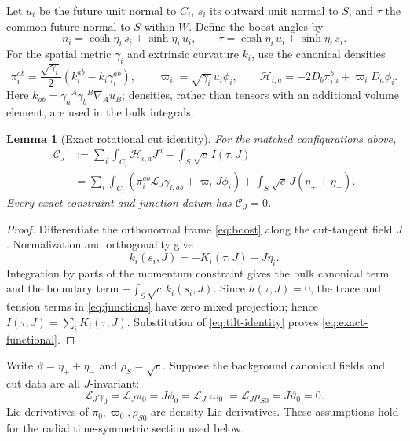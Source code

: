 \documentclass[11pt]{article}
\newtheorem{lemma}[theorem]{Lemma}
\theoremstyle{remark}
\newcommand{\Lie}{\mathcal L}
\begin{document}
Let $u_i$ be the future unit normal to $C_i$, $s_i$ its outward unit normal
to $S$, and $\tau$ the common future normal to $S$ within $W$. Define the
boost angles by
\begin{equation}
 n_i=\cosh\eta_i\,s_i+\sinh\eta_i\,u_i,
 \qquad
 \tau=\cosh\eta_i\,u_i+\sinh\eta_i\,s_i.
 \label{eq:boost}
\end{equation}
For the spatial metric $\gamma_i$ and extrinsic curvature $k_i$, use the
canonical densities
\begin{equation}
 \pi_i^{ab}=\frac{\sqrt{\gamma_i}}{2}
 (k_i^{ab}-k_i\gamma_i^{ab}),\qquad
 \varpi_i=\sqrt{\gamma_i}\,u_i\phi_i,
 \qquad
 \mathcal H_{i,a}=-2D_b\pi_i^b{}_a+\varpi_iD_a\phi_i.
 \label{eq:canonical}
\end{equation}
Here $k_{ab}=\gamma_a{}^A\gamma_b{}^B\nabla_Au_B$; densities, rather than
tensors with an additional volume element, are used in the bulk integrals.

\begin{lemma}[Exact rotational cut identity]
\label{lem:cut}
For the matched configurations above,
\begin{align}
 \mathcal C_J
 &:={\sum_i}\int_{C_i}\mathcal H_{i,a}J^a
       -\int_S\sqrt c\,I(\tau,J)\nonumber\\
 &=\sum_i\int_{C_i}
       (\pi_i^{ab}\Lie_J\gamma_{i,ab}+\varpi_iJ\phi_i)
       +\int_S\sqrt c\,J(\eta_++\eta_-).
 \label{eq:exact-functional}
\end{align}
Every exact constraint-and-junction datum has $\mathcal C_J=0$.
\end{lemma}
\begin{proof}
Differentiate the orthonormal frame \eqref{eq:boost} along the cut-tangent
field $J$. Normalization and orthogonality give
\begin{equation}
 k_i(s_i,J)=-K_i(\tau,J)-J\eta_i.
 \label{eq:tilt-identity}
\end{equation}
Integration by parts of the momentum constraint gives the bulk canonical
term and the boundary term $-\int_S\sqrt c\,k_i(s_i,J)$. Since
$h(\tau,J)=0$, the trace and tension terms in \eqref{eq:junctions} have
zero mixed projection; hence $I(\tau,J)=\sum_iK_i(\tau,J)$. Substitution
of \eqref{eq:tilt-identity} proves \eqref{eq:exact-functional}.
\end{proof}

Write $\vartheta=\eta_++\eta_-$ and $\rho_S=\sqrt c$. Suppose the background
canonical fields and cut data are all $J$-invariant:
\begin{equation}
 \Lie_J\gamma_0=\Lie_J\pi_0=J\phi_0=\Lie_J\varpi_0
 =\Lie_J\rho_{S0}=J\vartheta_0=0.
 \label{eq:invariant-background}
\end{equation}
Lie derivatives of $\pi_0,\varpi_0,\rho_{S0}$ are density Lie derivatives.
These assumptions hold for the radial time-symmetric section used below.
\end{document}
